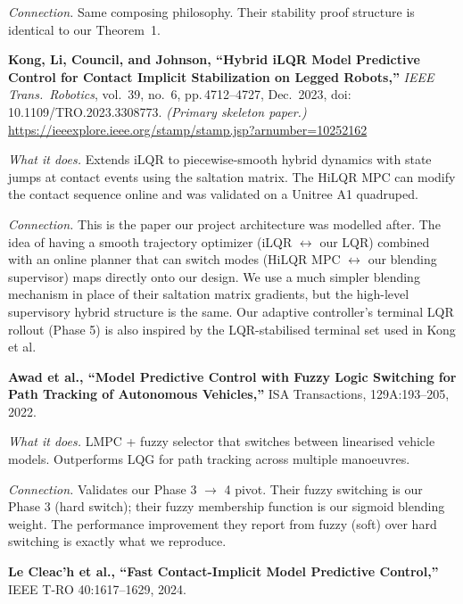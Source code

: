 \documentclass[12pt,a4paper]{article}
\begin{document}
\begin{enumerate}[label={[\arabic*]}, leftmargin=1.5cm, itemsep=10pt]
  \textit{Connection.}
  Same composing philosophy. Their stability proof structure is
  identical to our Theorem~1.

  \medskip

  \item \textbf{Kong, Li, Council, and Johnson, ``Hybrid iLQR Model Predictive Control for
    Contact Implicit Stabilization on Legged Robots,''} \textit{IEEE Trans.\ Robotics},
    vol.~39, no.~6, pp.\,4712--4727, Dec.\ 2023, doi:\,10.1109/TRO.2023.3308773. \emph{(Primary skeleton paper.)}
    \url{https://ieeexplore.ieee.org/stamp/stamp.jsp?arnumber=10252162}

  \textit{What it does.}
  Extends iLQR to piecewise-smooth hybrid dynamics with state jumps at
  contact events using the saltation matrix. The HiLQR MPC can modify
  the contact sequence online and was validated on a Unitree A1 quadruped.

  \textit{Connection.}
  This is the paper our project architecture was modelled after. The idea
  of having a smooth trajectory optimizer (iLQR $\leftrightarrow$ our LQR)
  combined with an online planner that can switch modes (HiLQR MPC
  $\leftrightarrow$ our blending supervisor) maps directly onto our design.
  We use a much simpler blending mechanism in place of their saltation
  matrix gradients, but the high-level supervisory hybrid structure is the
  same. Our adaptive controller's terminal LQR rollout (Phase 5) is also
  inspired by the LQR-stabilised terminal set used in Kong et al.

  \medskip

  \item \textbf{Awad et al., ``Model Predictive Control with Fuzzy Logic
    Switching for Path Tracking of Autonomous Vehicles,''} ISA
    Transactions, 129A:193--205, 2022.

  \textit{What it does.}
  LMPC + fuzzy selector that switches between linearised vehicle models.
  Outperforms LQG for path tracking across multiple manoeuvres.

  \textit{Connection.}
  Validates our Phase 3 $\to$ 4 pivot. Their fuzzy switching is our
  Phase 3 (hard switch); their fuzzy membership function is our sigmoid
  blending weight. The performance improvement they report from fuzzy
  (soft) over hard switching is exactly what we reproduce.

  \medskip

  \item \textbf{Le Cleac'h et al., ``Fast Contact-Implicit Model Predictive
    Control,''} IEEE T-RO 40:1617--1629, 2024.


\end{enumerate}
\end{document}
